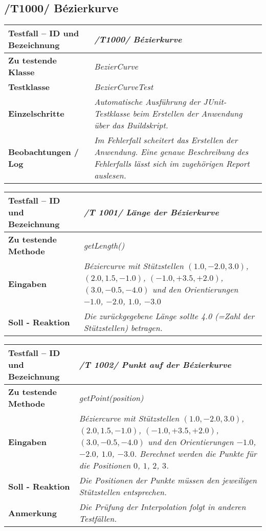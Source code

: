 \subsection{/T1000/ Bézierkurve}

\begin{longtable}{|p{7cm}|p{10cm}|}
\hline
\textbf{Testfall -- ID und Bezeichnung} &  \textit{/T1000/ Bézierkurve} \\
\hline
\textbf{Zu testende Klasse} &  \textit{BezierCurve} \\
\hline
\textbf{Testklasse} &  \textit{BezierCurveTest} \\
\hline
\textbf{Einzelschritte} &  \textit{Automatische Ausführung der JUnit-Testklasse beim Erstellen
der Anwendung über das Buildskript.} \\
\hline
\textbf{Beobachtungen / Log} &  \textit{Im Fehlerfall scheitert das Erstellen der Anwendung.
Eine genaue Beschreibung des Fehlerfalls lässt sich im zugehörigen Report auslesen.} \\
\hline

\end{longtable}

\begin{longtable}{|p{7cm}|p{10cm}|}
\hline
\textbf{Testfall -- ID und Bezeichnung} & \textit{ /T 1001/ Länge der Bézierkurve} \\
\hline
\textbf{Zu testende Methode} &  \textit{getLength()} \\
\hline
\textbf{Eingaben} & \textit{Béziercurve mit Stützstellen $(1.0, -2.0, 3.0)$,
$(2.0, 1.5, -1.0)$, $(-1.0, +3.5, +2.0)$, $(3.0, -0.5, -4.0)$ und
den Orientierungen $-1.0$, $-2.0$, $1.0$, $-3.0$ }\\
\hline
\textbf{Soll - Reaktion} & \textit{Die zurückgegebene Länge sollte 4.0 (=Zahl der Stützstellen)
betragen.} \\
\hline
\end{longtable}

\begin{longtable}{|p{7cm}|p{10cm}|}
\hline
\textbf{Testfall -- ID und Bezeichnung} & \textit{ /T 1002/ Punkt auf der Bézierkurve} \\
\hline
\textbf{Zu testende Methode} &  \textit{getPoint(position)} \\
\hline
\textbf{Eingaben} & \textit{Béziercurve mit Stützstellen $(1.0, -2.0, 3.0)$,
$(2.0, 1.5, -1.0)$, $(-1.0, +3.5, +2.0)$, $(3.0, -0.5, -4.0)$ und
den Orientierungen $-1.0$, $-2.0$, $1.0$, $-3.0$. Berechnet werden die Punkte für
die Positionen $0$, $1$, $2$, $3$.}\\
\hline
\textbf{Soll - Reaktion} & \textit{Die Positionen der Punkte müssen den
jeweiligen Stützstellen entsprechen.} \\
\hline
\textbf{Anmerkung} & \textit{Die Prüfung der Interpolation folgt in anderen Testfällen.} \\
\hline
\end{longtable}

